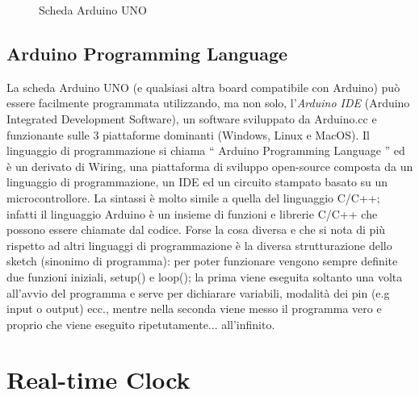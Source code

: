 \documentclass[12pt]{report}
\begin{document}
\begin{figure}[H]
	\caption{Scheda Arduino UNO}
	\label{fig:uno}
\end{figure}

%
\subsection{Arduino Programming Language}
%

La scheda Arduino UNO (e qualsiasi altra board compatibile con Arduino) può essere facilmente programmata utilizzando, ma non solo, l'\emph{Arduino IDE} (Arduino Integrated Development Software), un software sviluppato da Arduino.cc e funzionante sulle 3 piattaforme dominanti (Windows, Linux e MacOS). Il linguaggio di programmazione si chiama \textquotedblleft{} Arduino Programming Language \textquotedblright{}\cite{sistemi_embedded_atrent} ed è un derivato di Wiring, una piattaforma di sviluppo open-source composta da un linguaggio di programmazione, un IDE ed un circuito stampato basato su un microcontrollore. La sintassi è molto simile a quella del linguaggio C/C++; infatti il linguaggio Arduino è un insieme di funzioni e librerie C/C++ che possono essere chiamate dal codice. Forse la cosa diversa e che si nota di più rispetto ad altri linguaggi di programmazione è la diversa strutturazione dello sketch (sinonimo di programma): per poter funzionare vengono sempre definite due funzioni iniziali, setup() e loop(); la prima viene eseguita soltanto una volta all'avvio del programma e serve per dichiarare variabili, modalità dei pin (e.g input o output) ecc., mentre nella seconda viene messo il programma vero e proprio che viene eseguito ripetutamente... all'infinito.


%
\section{Real-time Clock}
%
\end{document}
